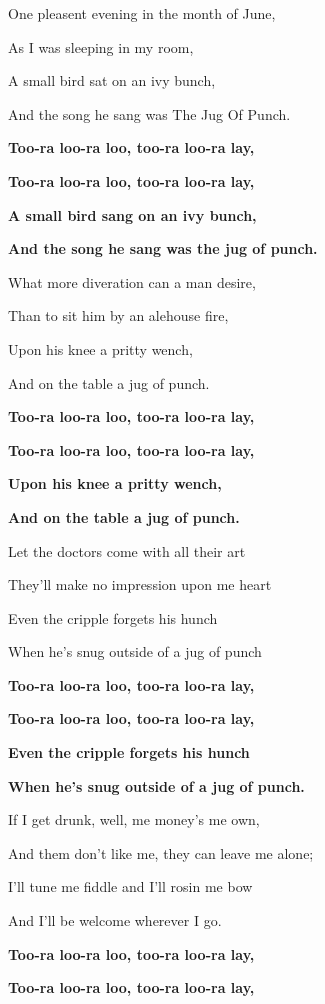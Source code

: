 One pleasent evening in the month of June,

As I was sleeping in my room,

A small bird sat on an ivy bunch,

And the song he sang was The Jug Of Punch.

\textbf{Too-ra loo-ra loo, too-ra loo-ra lay,}

\textbf{Too-ra loo-ra loo, too-ra loo-ra lay,}

\textbf{A small bird sang on an ivy bunch,}

\textbf{And the song he sang was the jug of punch.}

\bigskip

What more diveration can a man desire,

Than to sit him by an alehouse fire,

Upon his knee a pritty wench,

And on the table a jug of punch.

\textbf{Too-ra loo-ra loo, too-ra loo-ra lay,}

\textbf{Too-ra loo-ra loo, too-ra loo-ra lay,}

\textbf{Upon his knee a pritty wench,}

\textbf{And on the table a jug of punch.}

\bigskip

Let the doctors come with all their art

They'll make no impression upon me heart

Even the cripple forgets his hunch

When he's snug outside of a jug of punch

\textbf{Too-ra loo-ra loo, too-ra loo-ra lay,}

\textbf{Too-ra loo-ra loo, too-ra loo-ra lay,}

\textbf{Even the cripple forgets his hunch}

\textbf{When he's snug outside of a jug of punch.}

\bigskip

If I get drunk, well, me money's me own,

And them don't like me, they can leave me alone;

I'll tune me fiddle and I'll rosin me bow

And I'll be welcome wherever I go.

\textbf{Too-ra loo-ra loo, too-ra loo-ra lay,}

\textbf{Too-ra loo-ra loo, too-ra loo-ra lay,}

